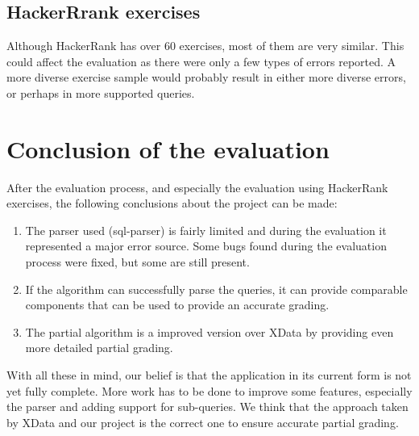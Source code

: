 \subsection{HackerRrank exercises}
Although HackerRank has over 60 exercises, most of them are very similar. This could affect the evaluation as there were only a few types of errors reported. A more diverse exercise sample would probably result in either more diverse errors, or perhaps in more supported queries.

\section{Conclusion of the evaluation}
After the evaluation process, and especially the evaluation using HackerRank exercises, the following conclusions about the project can be made:
\begin{enumerate}
    \item The parser used (sql-parser) is fairly limited and during the evaluation it represented a major error source. Some bugs found during the evaluation process were fixed, but some are still present.
    \item If the algorithm can successfully parse the queries, it can provide comparable components that can be used to provide an accurate grading.
    \item The partial algorithm is a improved version over XData by providing even more detailed partial grading.
\end{enumerate}

With all these in mind, our belief is that the application in its current form is not yet fully complete. More work has to be done to improve some features, especially the parser and adding support for sub-queries. We think that the approach taken by XData and our project is the correct one to ensure accurate partial grading.